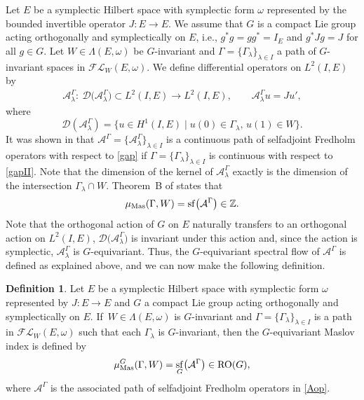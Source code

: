 \documentclass[pdftex]{sigma}
\numberwithin{equation}{section}
\theoremstyle{definition}
\newtheorem{Definition}[Theorem]{Definition}
\DeclareMathOperator{\sfl}{sf}
\begin{document}
Let $E$ be a symplectic Hilbert space with symplectic form $\omega$ represented by the bounded invertible operator $J \colon E\rightarrow E$. We assume that $G$ is a compact Lie group acting orthogonally and symplectically on $E$, i.e., $g^\ast g=g g^\ast=I_E$ and $g^\ast Jg=J$ for all $g\in G$. Let $W\in\Lambda(E,\omega)$ be $G$-invariant and $\Gamma=\{\Gamma_\lambda\}_{\lambda\in I}$ a path of $G$-invariant spaces in $\mathcal{FL}_W(E,\omega)$. We define differential operators on $L^2(I,E)$ by
\begin{align}\label{Aop}
\mathcal{A}^\Gamma_\lambda: \ \mathcal{D}\bigl(\mathcal{A}^\Gamma_\lambda\bigr)\subset L^2(I,E)\rightarrow L^2(I,E),\qquad \mathcal{A}^\Gamma_\lambda u=Ju',
\end{align}
where
\[\mathcal{D}(\mathcal{A}^\Gamma_\lambda)=\bigl\{u\in H^1(I,E) \mid u(0) \in\Gamma_\lambda,\, u(1)\in W\bigr\}.\]
It was shown in \cite{ODE} that $\mathcal{A}^\Gamma=\bigl\{\mathcal{A}^\Gamma_\lambda\bigr\}_{\lambda\in I}$ is a continuous path of selfadjoint Fredholm operators with respect to \eqref{gap} if $\Gamma=\{\Gamma_\lambda\}_{\lambda\in I}$ is continuous with respect to \eqref{gapII}. Note that the dimension of the kernel of $\mathcal{A}^\Gamma_\lambda$ exactly is the dimension of the intersection $\Gamma_\lambda\cap W$. Theorem~B of \cite{ODE} states that
\[\mu_{\rm Mas}(\Gamma,W)=\sfl\bigl(\mathcal{A}^\Gamma\bigr)\in\mathbb{Z}.\]
Note that the orthogonal action of $G$ on $E$ naturally transfers to an orthogonal action on $L^2(I,E)$, $\mathcal{D}\bigl(\mathcal{A}^\Gamma_\lambda\bigr)$ is invariant under this action and, since the action is symplectic, $\mathcal{A}^\Gamma_\lambda$ is $G$\nobreakdash-equiv\-ari\-ant. Thus, the $G$-equivariant spectral flow of $\mathcal{A}^\Gamma$ is defined as explained above, and we can now make the following definition.

\begin{Definition}\label{def-Maslov}
Let $E$ be a symplectic Hilbert space with symplectic form $\omega$ represented by $J \colon E\rightarrow E$ and $G$ a compact Lie group acting orthogonally and symplectically on $E$. If~$W\in\Lambda(E,\omega)$ is $G$-invariant and $\Gamma=\{\Gamma_\lambda\}_{\lambda\in I}$ is a path in $\mathcal{FL}_W(E,\omega)$ such that each $\Gamma_\lambda$ is $G$-invariant, then the $G$-equivariant Maslov index is defined by
\[\mu^G_{\rm Mas}(\Gamma,W)=\sfl_G\bigl(\mathcal{A}^\Gamma\bigr)\in \mathrm{RO}(G),\]
where $\mathcal{A}^\Gamma$ is the associated path of selfadjoint Fredholm operators in \eqref{Aop}.
\end{Definition}
\end{document}
